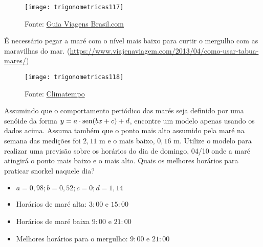 \documentclass[10 pt,usenames,dvipsnames, oneside]{article}
\begin{document}
\begin{figure}[H]
\centering

\texttt{[image: trigonometricas117]}
\caption{Fonte: \href{guiaviagensbrasil.com}{Guia Viagens Brasil.com}}
\label{}
\end{figure}

É necessário pegar a maré com o nível mais baixo para curtir o mergulho com as maravilhas do mar. (\url{https://www.viajenaviagem.com/2013/04/como-usar-tabua-mares/})

\begin{figure}[H]
\centering

\texttt{[image: trigonometricas118]}
\caption{Fonte: \href{https://www.climatempo.com.br/tabua-de-mares}{Climatempo}}
\label{}
\end{figure}

Assumindo que o comportamento periódico das marés seja definido por uma senóide da forma $y = a\cdot\operatorname{sen}(bx+c) + d$, encontre um modelo apenas usando os dados acima. Assuma também que o ponto mais alto assumido pela maré na semana das medições foi $2{,}11$ m e o mais baixo, $0{,}16$ m. Utilize o modelo para realizar uma previsão sobre os horários do dia de domingo, 04/10 onde a maré atingirá o ponto mais baixo e o mais alto. Quais os melhores horários para praticar snorkel naquele dia?

\ifdefined\prof
\begin{solucao}

\begin{itemize}
\item $a=0{,}98; b=0{,}52; c=0; d=1{,}14$
\item Horários de maré alta: $3{:}00$ e $15{:}00$
\item Horários de maré baixa $9{:}00$ e $21{:}00$
\item Melhores horários para o mergulho: $9{:}00$ e $21{:}00$
\end{itemize}
\end{solucao}
\fi
\end{document}
